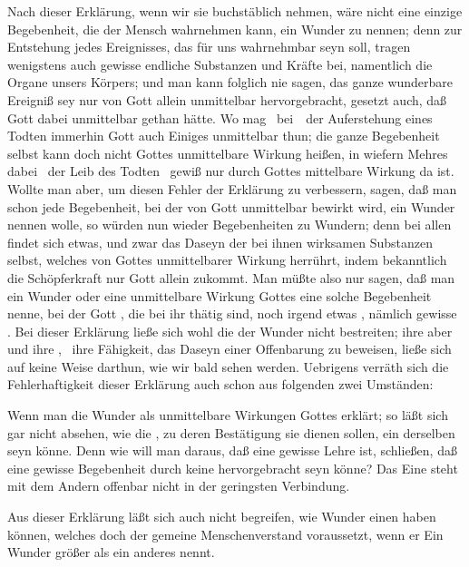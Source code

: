   Nach dieser Erklärung, wenn wir sie buchstäblich nehmen, wäre nicht eine einzige Begebenheit, die der Mensch wahrnehmen kann, ein Wunder zu nennen; denn zur Entstehung jedes Ereignisses, das für uns wahrnehmbar seyn soll, tragen  wenigstens auch gewisse endliche Substanzen und Kräfte bei, namentlich die Organe unsers Körpers; und man kann folglich nie sagen, das ganze wunderbare Ereigniß sey nur von Gott allein unmittelbar hervorgebracht, gesetzt auch, daß Gott  dabei unmittelbar gethan hätte. Wo mag \zB\ bei~\ der Auferstehung eines Todten immerhin Gott auch Einiges unmittelbar thun; die ganze Begebenheit selbst kann doch nicht Gottes unmittelbare Wirkung heißen, in wiefern Mehres dabei \zB\ der Leib des Todten \udgl\  gewiß nur durch Gottes mittelbare Wirkung da ist. Wollte man aber, um diesen Fehler der Erklärung zu verbessern, sagen, daß man schon jede Begebenheit, bei der  von Gott unmittelbar bewirkt wird, ein Wunder nennen wolle, so würden nun wieder  Begebenheiten zu Wundern; denn bei allen findet sich etwas, und zwar das Daseyn der bei ihnen wirksamen Substanzen selbst, welches von Gottes unmittelbarer Wirkung herrührt, indem bekanntlich die Schöpferkraft nur Gott allein zukommt. Man müßte also nur sagen, daß man ein Wunder oder eine unmittelbare Wirkung Gottes eine solche Begebenheit nenne, bei der Gott , die bei ihr thätig sind, noch irgend etwas , nämlich gewisse . Bei dieser Erklärung ließe sich wohl die  der Wunder nicht bestreiten; ihre  aber und ihre , \dh\ ihre Fähigkeit, das Daseyn einer Offenbarung zu beweisen, ließe sich auf keine Weise darthun, wie wir bald sehen werden. Uebrigens verräth sich die Fehlerhaftigkeit dieser Erklärung auch schon aus folgenden zwei Umständen:
\begin{aufzb}
\item Wenn man die Wunder als unmittelbare Wirkungen Gottes erklärt; so läßt sich gar nicht absehen, wie die , zu deren Bestätigung sie dienen sollen, ein  derselben seyn könne. Denn wie will man daraus, daß eine gewisse Lehre  ist, schließen, daß eine gewisse Begebenheit durch keine  hervorgebracht seyn könne? Das Eine steht mit dem Andern offenbar nicht in der geringsten Verbindung.
\item Aus dieser Erklärung läßt sich auch nicht begreifen, wie Wunder einen  haben können, welches doch der gemeine Menschenverstand voraussetzt, wenn er Ein Wunder größer als ein anderes nennt.~
\end{aufzb}

